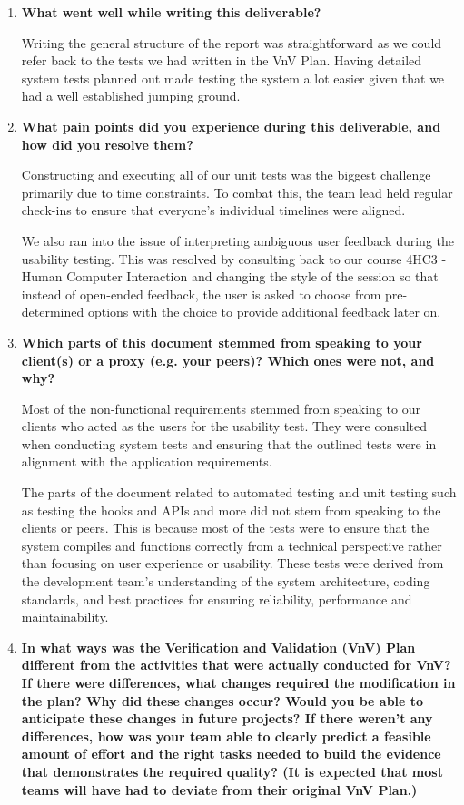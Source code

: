 \documentclass[12pt, titlepage]{article}
\begin{document}
\begin{enumerate}
  \item \textbf{What went well while writing this deliverable?}

  Writing the general structure of the report was straightforward as we could
  refer back to the tests we had written in the VnV Plan. Having detailed system
  tests planned out made testing the system a lot easier given that we had a
  well established jumping ground.

  \item \textbf{What pain points did you experience during this deliverable, and
  how did you resolve them?}

  Constructing and executing all of our unit tests was the biggest challenge
  primarily due to time constraints. To combat this, the team lead held regular
  check-ins to ensure that everyone's individual timelines were aligned.

  We also ran into the issue of interpreting ambiguous user feedback during the
  usability testing. This was resolved by consulting back to our course 4HC3 -
  Human Computer Interaction and changing the style of the session so that
  instead of open-ended feedback, the user is asked to choose from
  pre-determined options with the choice to provide additional feedback later
  on.

  \item \textbf{Which parts of this document stemmed from speaking to your
  client(s) or a proxy (e.g. your peers)? Which ones were not, and why?}

  Most of the non-functional requirements stemmed from speaking to our clients
  who acted as the users for the usability test. They were consulted when
  conducting system tests and ensuring that the outlined tests were in alignment
  with the application requirements. 

  The parts of the document related to automated testing and unit testing such
  as testing the hooks and APIs and more did not stem from speaking to the
  clients or peers. This is because most of the tests were to ensure that the
  system compiles and functions correctly from a technical perspective rather
  than focusing on user experience or usability. These tests were derived from
  the development team's understanding of the system architecture, coding
  standards, and best practices for ensuring reliability, performance and
  maintainability.

  \item \textbf{In what ways was the Verification and Validation (VnV) Plan
  different from the activities that were actually conducted for VnV?  If there
  were differences, what changes required the modification in the plan?  Why did
  these changes occur?  Would you be able to anticipate these changes in future
  projects?  If there weren't any differences, how was your team able to clearly
  predict a feasible amount of effort and the right tasks needed to build the
  evidence that demonstrates the required quality?  (It is expected that most
  teams will have had to deviate from their original VnV Plan.)}


\end{enumerate}
\end{document}
